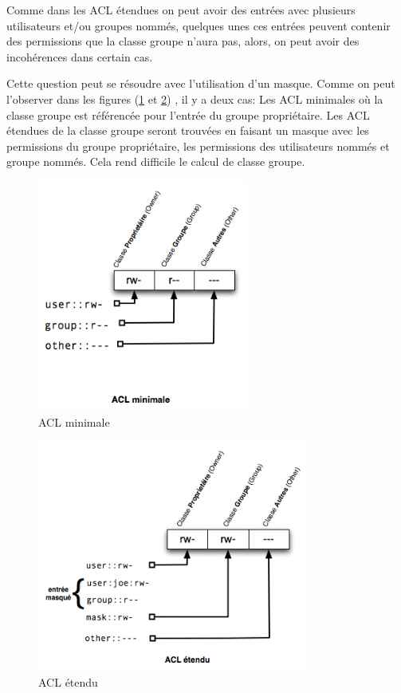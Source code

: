 \documentclass{article}
\begin{document}
Comme dans les ACL étendues on peut avoir des entrées avec plusieurs utilisateurs et/ou groupes nommés, quelques unes ces entrées peuvent contenir des permissions que la classe groupe n'aura pas, alors, on peut avoir des incohérences dans certain cas. 


Cette question peut se résoudre avec l'utilisation d'un masque. Comme on peut l'observer dans les figures (\ref{fig:img_acl-mapping1} et \ref{fig:img_acl-mapping2}) , il y a deux cas:  Les ACL minimales où la classe groupe est référencée pour l'entrée du groupe propriétaire. Les ACL étendues de la classe groupe seront trouvées en faisant un masque avec les permissions du groupe propriétaire, les permissions des utilisateurs nommés et groupe nommés. Cela rend difficile le calcul de classe groupe. 

\begin{figure}[htbp]
\centering
\includegraphics[height=3in]{img/acl-mapping-min.jpg}
\caption{ACL minimale}
\label{fig:img_acl-mapping1}
\end{figure}
 

\begin{figure}[htbp]
\centering
\includegraphics[height=3in]{img/acl-mapping-etendu.jpg}
\caption{ACL étendu}
\label{fig:img_acl-mapping2}
\end{figure}
\end{document}
